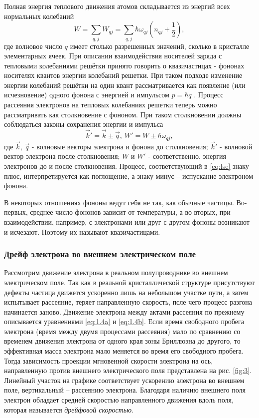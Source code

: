 Полная энергия теплового движения атомов складывается из энергий всех нормальных колебаний
\begin{equation}
	W=\sum_{q,j} W_{qj}=\sum_{q,j} \hbar \omega_{qj} (n_{qj}+\frac12),
\end{equation}
где волновое число $q$ имеет столько разрешенных значений, сколько в кристалле
элементарных ячеек. При описании взаимодействия носителей заряда с тепловыми колебаниями решётки принято говорить о квазичастицах - фононах носителях квантов энергии колебаний решетки. При таком подходе изменение энергии колебаний решётки на один квант рассматривается как появление (или исчезновение) одного фонона с энергией и импульсом $ p = \hbar q$ . Процесс
рассеяния электронов на тепловых колебаниях решетки теперь можно рассматривать как столкновение с фононом. При таком столкновении должны соблюдаться законы сохранения энергии и импульса 
\begin{equation}
	\label{eq:lse}
	\vec k' = \vec k \pm \vec q, ~ W'= W\pm \hbar \omega_{qj},
\end{equation}
где $\vec k$, $\vec q$ - волновые векторы электрона и фонона до столкновения; $\vec k'$ - волновой вектор электрона после столкновения; $W$ и $W'$ - соответственно, энергия электронов до и после столкновения. Процесс, соответствующий в \eqref{eq:lse} знаку плюс, интерпретируется как поглощение, а знаку минус -- испускание электроном фонона.

В некоторых отношениях фононы ведут себя не так, как обычные частицы. Во-первых, среднее число фононов зависит от температуры, а во-вторых, при взаимодействии, например, с электронами или друг с другом фононы возникают и исчезают. Поэтому их называют квазичастицами.

\subsubsection{Дрейф электрона во внешнем электрическом поле}


Рассмотрим движение электрона в реальном полупроводнике во внешнем электрическом поле. Так как в реальной кристаллической структуре присутствуют дефекты частица движется ускоренно лишь на небольшом участке пути, а затем испытывает рассеяние, теряет направленную скорость, псле чего процесс разгона начинается заново. Движение электрона между актами рассеяния по прежнему описывается уравнениями  \eqref{eq:1.4a} и \eqref{eq:1.4b}. Если время свободного пробега электрона (время между двумя процессами рассеяния) мало по сравнению со временем движения электрона от одного края зоны Бриллюэна до другого, то эффективная масса электрона мало меняется во время его свободного пробега. Тогда зависимость проекции мгновенной скорости электрона на ось, направленную против внешнего электрического поля представлена на рис. \ref{fig:3}. Линейный участок на графике соответствует ускорению электрона во внешнем поле, вертикальный -- рассеянию электрона. Благодаря наличию внешнего поля электрон обладает средней скоростью направленного движения вдоль поля, которая называется \textit{дрейфовой скоростью}.

